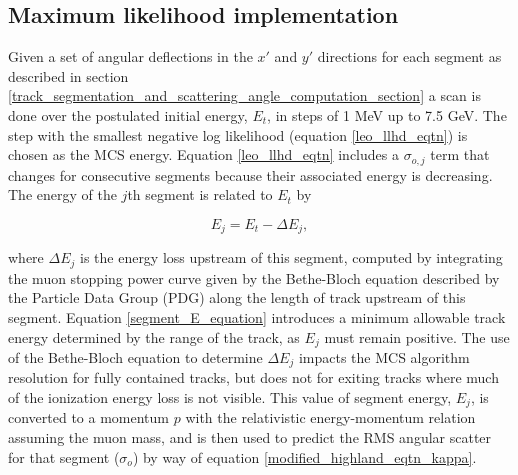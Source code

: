\documentclass[a4paper,11pt]{article}
\begin{document}











\subsection{Maximum likelihood implementation}\label{maximum_likelihood_section}

Given a set of angular deflections in the $x'$ and $y'$ directions for each segment as described in section \ref{track_segmentation_and_scattering_angle_computation_section} a scan is done over the postulated initial energy, $E_t$, in steps of 1 MeV up to 7.5 GeV. The step with the smallest negative log likelihood (equation \ref{leo_llhd_eqtn}) is chosen as the MCS energy. Equation \ref{leo_llhd_eqtn} includes a $\sigma_{o,j}$ term that changes for consecutive segments because their associated energy is decreasing. The energy of the $j$th segment is related to $E_t$ by

\begin{equation}\label{segment_E_equation}
E_{j} = E_t - \Delta E_{j},
\end{equation}

\noindent where $\Delta E_{j}$ is the energy loss upstream of this segment, computed by integrating the muon stopping power curve given by the Bethe-Bloch equation described by the Particle Data Group (PDG) \cite{stoppingpowersource} along the length of track upstream of this segment. Equation \ref{segment_E_equation} introduces a minimum allowable track energy determined by the range of the track, as $E_{j}$ must remain positive. The use of the Bethe-Bloch equation to determine $\Delta E_{j}$ impacts the MCS algorithm resolution for fully contained tracks, but does not for exiting tracks where much of the ionization energy loss is not visible. This value of segment energy, $E_{j}$, is converted to a momentum $p$ with the relativistic energy-momentum relation assuming the muon mass, and is then used to predict the RMS angular scatter for that segment ($\sigma_o$) by way of equation \ref{modified_highland_eqtn_kappa}. 
\end{document}

